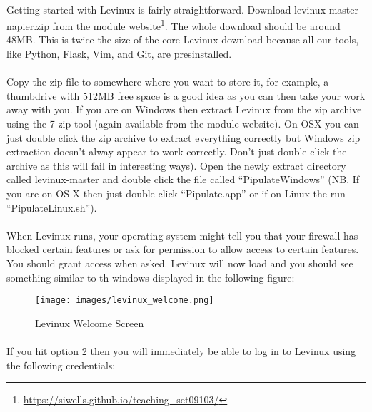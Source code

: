 \documentclass[12pt, a4paper, twoside]{book}
\begin{document}
\paragraph{} Getting started with Levinux is fairly straightforward. Download levinux-master-napier.zip from the module website\footnote{\url{https://siwells.github.io/teaching_set09103/}}. The whole download should be around 48MB. This is twice the size of the core Levinux download because all our tools, like Python, Flask, Vim, and Git, are presinstalled. 

\paragraph{} Copy the zip file to somewhere where you want to store it, for example, a thumbdrive with 512MB free space is a good idea as you can then take your work away with you. If you are on Windows then extract Levinux from the zip archive using the 7-zip tool (again available from the module website). On OSX you can just double click the zip archive to extract everything correctly but Windows zip extraction doesn't alway appear to work correctly. Don't just double click the archive as this will fail in interesting ways). Open the newly extract directory called levinux-master and double click the file called ``PipulateWindows'' (NB. If you are on OS X then just double-click ``Pipulate.app'' or if on Linux the run ``PipulateLinux.sh'').

\paragraph{} When Levinux runs, your operating system might tell you that your firewall has blocked certain features or ask for permission to allow access to certain features. You should grant access when asked. Levinux will now load and you should see something similar to th windows displayed in the following figure:

\begin{figure}[H]
\centering
\texttt{[image: images/levinux\_welcome.png]}
\caption{Levinux Welcome Screen}
\label{fig:levinux-welcome}
\end{figure}

\paragraph{} If you hit option 2 then you will immediately be able to log in to Levinux using the following credentials:
\end{document}
